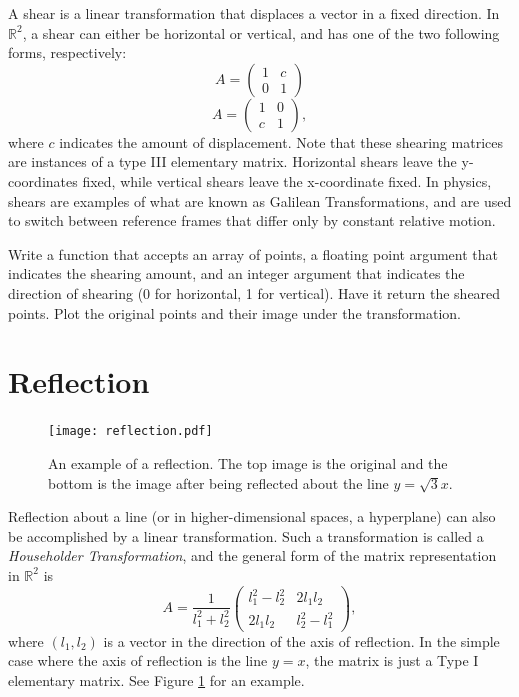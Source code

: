 A shear is a linear transformation that displaces a vector in a fixed direction.
In $\mathbb{R}^2$, a shear can either be horizontal or vertical, and has one of
the two following forms, respectively:
\[
A = \begin{pmatrix}
1 & c \\
0 & 1
\end{pmatrix}
\]
\[
A = \begin{pmatrix}
1 & 0 \\
c & 1
\end{pmatrix},
\]
where $c$ indicates the amount of displacement.  Note that
these shearing matrices are instances of a type III elementary matrix. Horizontal
shears leave the y-coordinates fixed, while vertical shears leave the x-coordinate
fixed. In physics, shears are examples of what are known as Galilean Transformations, and are used
to switch between reference frames that differ only by constant relative motion.

\begin{problem}
Write a function that accepts an array of points, a floating point argument that
indicates the shearing amount, and an integer argument
that indicates the direction of shearing (0 for horizontal, 1 for vertical).
Have it return the sheared points.
Plot the original points and their image under the transformation.
\end{problem}

\section*{Reflection}
\begin{figure}
\centering
\texttt{[image: reflection.pdf]}
\caption{An example of a reflection.
The top image is the original and the bottom is the image after
being reflected about the line $y = \sqrt{3}x$.}
\label{basis:reflection}
\end{figure}
Reflection about a line (or in higher-dimensional spaces, a hyperplane) can also be
accomplished by a linear transformation. Such a transformation is called a
\emph{Householder Transformation}, and the general form of the matrix representation in
$\mathbb{R}^2$ is
\[
A = \frac{1}{l_1^2 + l_2^2}
\begin{pmatrix}
l_1^2 - l_2^2 & 2l_1l_2 \\
2l_1l_2 & l_2^2 - l_1^2
\end{pmatrix},
\]
where $(l_1, l_2)$ is a vector in the direction of the axis of reflection. In the simple
case where the axis of reflection is the line $y=x$, the matrix is just a Type I elementary
matrix. See Figure \ref{basis:reflection} for an example.

